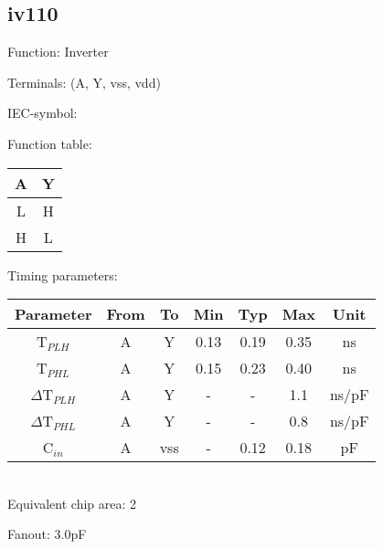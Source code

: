 \subsection{iv110}

Function: Inverter

Terminals: (A, Y, vss, vdd)


IEC-symbol:
\begin{figure}[bth]
\end{figure}

\begin{minipage}[t]{0.3\textwidth}
Function table:\\

\begin{tabular}{|c||c|}
\hline
A	&Y\\
\hline
L	&H\\
H	&L\\
\hline
\end{tabular}
\end{minipage}
\hfill
\begin{minipage}[t]{0.6\textwidth}
Timing parameters:\\

\begin{tabular}{|c|cc|ccc|c|}
\hline
Parameter		&From	&To	&Min	&Typ	&Max	&Unit\\
\hline
T$_{PLH}$               &A	&Y	&0.13	&0.19	&0.35	&ns\\
T$_{PHL}$               &A	&Y	&0.15	&0.23	&0.40	&ns\\
\hline
$\Delta$T$_{PLH}$       &A	&Y	&-	&-	&1.1	&ns/pF\\
$\Delta$T$_{PHL}$       &A	&Y	&-	&-	&0.8	&ns/pF\\
\hline
C$_{in}$                &A	&vss	&-	&0.12	&0.18	&pF\\
\hline
\end{tabular}
\end{minipage}
\\

Equivalent chip area: 2

Fanout: 3.0pF


\clearpage
